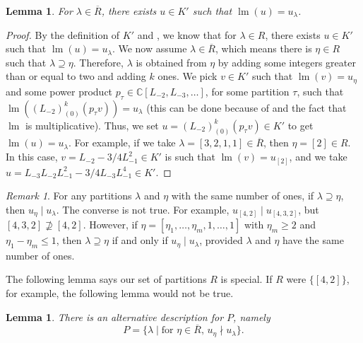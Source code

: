 \documentclass[a4paper, 12pt, reqno]{amsart}
\newtheorem{lemma}[theorem]{Lemma}
\theoremstyle{remark}
\newtheorem{remark}[theorem]{Remark}
\DeclareMathOperator{\lm}{lm}
\begin{document}
\begin{lemma}
  \label{lmm:38}
  For $\lambda \in \overline{R}$, there exists $u \in K'$ such that $\lm(u) = u_{\lambda}$.
\end{lemma}

\begin{proof}
  By the definition of $K'$ and \cite[Proposition 5.1]{andrews_singular_2022}, we know that for $\lambda \in R$, there exists $u \in K'$ such that $\lm(u) = u_{\lambda}$.
  We now assume $\lambda \in \overline{R}$, which means there is $\eta \in R$ such that $\lambda \supseteq \eta$.
  Therefore, $\lambda$ is obtained from $\eta$ by adding some integers greater than or equal to two and adding $k$ ones.
  We pick $v \in K'$ such that $\lm(v) = u_{\eta}$ and some power product $p_{\tau} \in \mathbb{C}[L_{-2}, L_{-3}, \dots]$, for some partition $\tau$, such that $\lm((L_{-2})^k_{(0)}(p_{\tau}v)) = u_{\lambda}$ (this can be done because of  and the fact that $\lm$ is multiplicative).
  Thus, we set $u = (L_{-2})^k_{(0)}(p_{\tau}v) \in K'$ to get $\lm(u) = u_{\lambda}$.
  For example, if we take $\lambda = [3, 2, 1, 1] \in \overline{R}$, then $\eta = [2] \in R$.
  In this case, $v = L_{-2}- 3/4L_{-1}^2 \in K'$ is such that $\lm(v) = u_{[2]}$, and we take $u = L_{-3}L_{-2}L_{-1}^2 - 3/4L_{-3}L_{-1}^4 \in K'$.
\end{proof}

\begin{remark}
  \label{rmk:52}
  For any partitions $\lambda$ and $\eta$ with the same number of ones, if $\lambda \supseteq \eta$, then $u_{\eta} \mid u_{\lambda}$.
  The converse is not true.
  For example, $u_{[4, 2]} \mid u_{[4, 3, 2]}$, but $[4, 3, 2] \nsupseteq [4, 2]$.
  However, if $\eta = [\eta_1, \dots, \eta_m, 1, \dots, 1]$ with $\eta_m \ge 2$ and $\eta_1 - \eta_m \le 1$, then $\lambda \supseteq \eta$ if and only if $u_{\eta} \mid u_{\lambda}$, provided $\lambda$ and $\eta$ have the same number of ones.
\end{remark}

The following lemma says our set of partitions $R$ is special.
If $R$ were $\{[4, 2]\}$, for example, the following lemma would not be true.

\begin{lemma}
  \label{lmm:39}
  There is an alternative description for $P$, namely
  \begin{equation*}
    P = \{\lambda \mid \text{for $\eta \in \overline{R}$, $u_{\eta} \nmid u_{\lambda}$}\}.
  \end{equation*}
\end{lemma}
\end{document}
